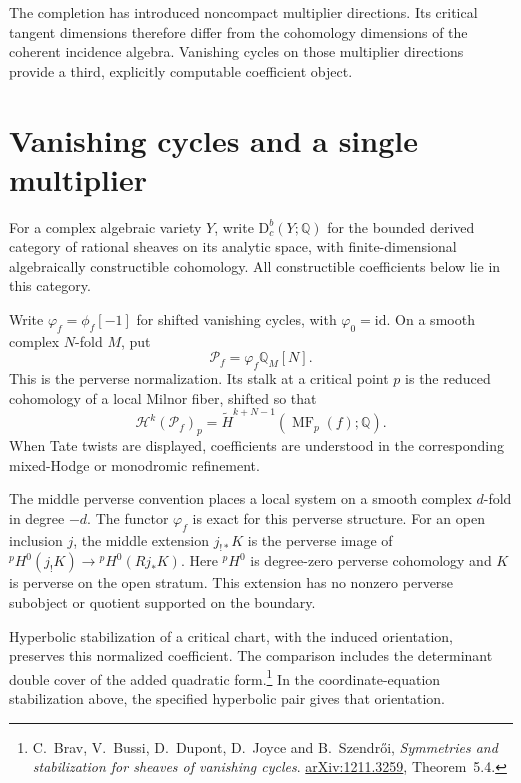 The completion has introduced noncompact multiplier directions.
Its critical tangent dimensions therefore differ from the
cohomology dimensions of the coherent incidence algebra.
Vanishing cycles on those multiplier directions provide a
third, explicitly computable coefficient object.
\section{Vanishing cycles and a single multiplier}
\label{vc:sec:vanishing}

For a complex algebraic variety $Y$, write
$\mathrm D_c^b(Y;\mathbb Q)$ for the bounded derived
category of rational sheaves on its analytic space, with
finite-dimensional algebraically constructible cohomology.
All constructible coefficients below lie in this category.

Write $\varphi_f=\phi_f[-1]$ for shifted vanishing
cycles, with $\varphi_0=\mathrm{id}$. On a smooth complex
$N$-fold $M$, put
\[
 \mathcal P_f=\varphi_f\mathbb Q_M[N].
\]
This is the perverse normalization. Its stalk at a critical
point $p$ is the reduced cohomology of a local Milnor fiber,
shifted so that
\begin{equation}\label{vc:vic:eq:milnor-shift}
 \mathcal H^k(\mathcal P_f)_p
       =\widetilde H^{k+N-1}(\operatorname{MF}_p(f);\mathbb Q).
\end{equation}
When Tate twists are displayed, coefficients are understood
in the corresponding mixed-Hodge or monodromic refinement.


The middle perverse convention places a local system on a
smooth complex $d$-fold in degree $-d$. The functor
$\varphi_f$ is exact for this perverse structure.
For an open inclusion $j$, the middle extension $j_{!*}K$
is the perverse image of
${}^pH^0(j_!K)\to{}^pH^0(Rj_*K)$.
Here ${}^pH^0$ is degree-zero perverse cohomology and $K$
is perverse on the open stratum. This extension has no
nonzero perverse subobject or quotient supported on the boundary.

Hyperbolic stabilization of a critical chart, with the
induced orientation, preserves this normalized coefficient.
The comparison includes the determinant double cover of the
added quadratic form.\footnote{C.~Brav, V.~Bussi, D.~Dupont,
D.~Joyce and B.~Szendr\H{o}i, \emph{Symmetries and stabilization
for sheaves of vanishing cycles}.
\href{https://arxiv.org/abs/1211.3259}{arXiv:1211.3259},
Theorem~5.4.} In the coordinate-equation stabilization above,
the specified hyperbolic pair gives that orientation.

